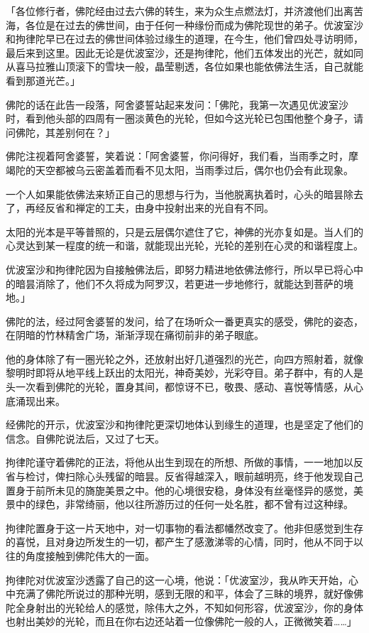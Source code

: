 \documentclass[twoside,openany]{book}
\begin{document}
「各位修行者，佛陀经由过去六佛的转生，来为众生点燃法灯，并济渡他们出离苦海，各位是在过去的佛世间，由于任何一种缘份而成为佛陀现世的弟子。优波室沙和拘律陀早已在过去的佛世间体验过缘生的道理，在今生，他们曾四处寻访明师，最后来到这里。因此无论是优波室沙，还是拘律陀，他们五体发出的光芒，就如同从喜马拉雅山顶滚下的雪块一般，晶莹剔透，各位如果也能依佛法生活，自己就能看到那道光芒。」

佛陀的话在此告一段落，阿舍婆誓站起来发问：「佛陀，我第一次遇见优波室沙时，看到他头部的四周有一圈淡黄色的光轮，但如今这光轮已包围他整个身子，请问佛陀，其差别何在？」

佛陀注视着阿舍婆誓，笑着说：「阿舍婆誓，你问得好，我们看，当雨季之时，摩竭陀的天空都被乌云密盖着而看不见太阳，当雨季过后，偶尔也仍会有此现象。

一个人如果能依佛法来矫正自己的思想与行为，当他脱离执着时，心头的暗昙除去了，再经反省和禅定的工夫，由身中投射出来的光自有不同。

太阳的光本是平等普照的，只是云层偶尔遮住了它，神佛的光亦复如是。当人们的心灵达到某一程度的统一和谐，就能现出光轮，光轮的差别在心灵的和谐程度上。

优波室沙和拘律陀因为自接触佛法后，即努力精进地依佛法修行，所以早已将心中的暗昙消除了，他们不久将成为阿罗汉，若更进一步地修行，就能达到菩萨的境地。」

佛陀的法，经过阿舍婆誓的发问，给了在场听众一番更真实的感受，佛陀的姿态，在阴暗的竹林精舍广场，渐渐浮现在痛彻前非的弟子眼底。

他的身体除了有一圈光轮之外，还放射出好几道强烈的光芒，向四方照射着，就像黎明时即将从地平线上跃出的太阳光，神奇美妙，光彩夺目。弟子群中，有的人是头一次看到佛陀的光轮，置身其间，都惊讶不已，敬畏、感动、喜悦等情感，从心底涌现出来。

经佛陀的开示，优波室沙和拘律陀更深切地体认到缘生的道理，也是坚定了他们的信念。自佛陀说法后，又过了七天。

拘律陀谨守着佛陀的正法，将他从出生到现在的所想、所做的事情，一一地加以反省与检讨，俾扫除心头残留的暗昙。反省得越深入，眼前越明亮，终于他发现自己置身于前所未见的旖旎美景之中。他的心境很安稳，身体没有丝毫怪异的感觉，美景中的绿色，非常绮丽，他以往所游历过的任何一处名胜，都不曾有过这种绿。

拘律陀置身于这一片天地中，对一切事物的看法都幡然改变了。他非但感觉到生存的喜悦，且对身边所发生的一切，都产生了感激涕零的心情，同时，他从不同于以往的角度接触到佛陀伟大的一面。

拘律陀对优波室沙透露了自己的这一心境，他说：「优波室沙，我从昨天开始，心中充满了佛陀所说过的那种光明，感到无限的和平，体会了三眛的境界，就好像佛陀全身射出的光轮给人的感觉，除伟大之外，不知如何形容，优波室沙，你的身体也射出美妙的光轮，而且在你右边还站着一位像佛陀一般的人，正微微笑着……」
\end{document}
